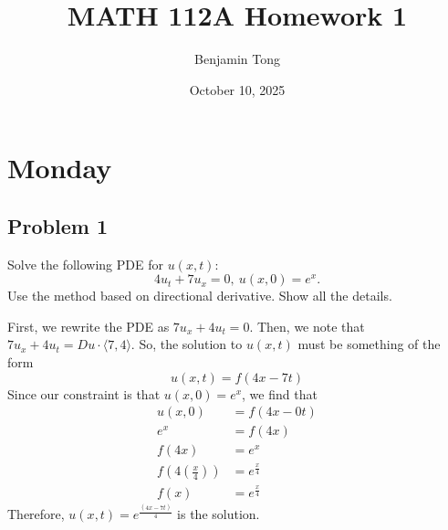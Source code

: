 \documentclass{ben}
\title{MATH 112A Homework 1}
\author{Benjamin Tong}
\date{October 10, 2025}
\begin{document}
\maketitle
\section{Monday}
\subsection{Problem 1}
\noindent
Solve the following PDE for $u(x, t)$:
\[
4u_t + 7u_x = 0,\ u(x, 0) = e^x.
\]
Use the method based on directional derivative. Show all the details.
\begin{solution}
    First, we rewrite the PDE as $7u_x + 4u_t = 0$.
    Then, we note that $7u_x + 4u_t = Du \cdot \langle 7, 4 \rangle$. So, the solution to
    $u(x, t)$ must be something of the form
    \[
        u(x, t) = f(4x - 7t)
    \]
    Since our constraint is that $u(x, 0) = e^x$, we find that
    \begin{align*}
        u(x, 0) &= f(4x - 0t)\\
        e^x &= f(4x)\\
        f(4x) &= e^x\\
        f\left( 4 \left( \frac{x}{4} \right) \right) &= e^{\frac{x}{4}}\\
        f(x) &= e^{\frac{x}{4}}
    \end{align*}
    Therefore, $u(x, t) = e^{\frac{(4x - 7t)}{4}}$ is the solution.
\end{solution}
\end{document}
